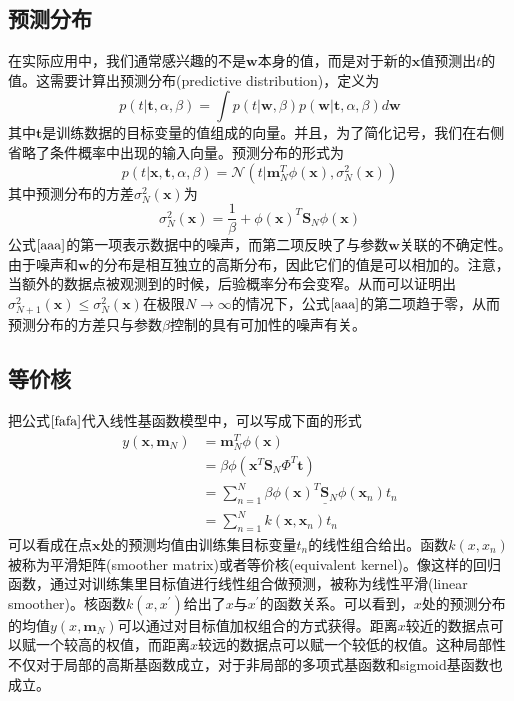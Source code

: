 \subsection*{预测分布}
在实际应用中，我们通常感兴趣的不是$\boldsymbol{w}$本身的值，而是对于新的$\boldsymbol{x}$值预测出$t$的值。这需要计算出预测分布(predictive distribution)，定义为
\begin{equation}
	p(t|\boldsymbol{t},\alpha,\beta)=\int p(t|\boldsymbol{w},\beta)p(\boldsymbol{w}|\boldsymbol{t},\alpha,\beta)d\boldsymbol{w}
\end{equation}
其中$\boldsymbol{t}$是训练数据的目标变量的值组成的向量。并且，为了简化记号，我们在右侧省略了条件概率中出现的输入向量。预测分布的形式为
\begin{equation}
	p(t|\boldsymbol{x},\boldsymbol{t},\alpha,\beta)=\mathcal{N}(t|\boldsymbol{m}^T_N\phi(\boldsymbol{x}),\sigma^2_N(\boldsymbol{x}))
\end{equation}
其中预测分布的方差$\sigma_N^2(\boldsymbol{x})$为
\begin{equation}
\label{aaa}
	\sigma_N^2(\boldsymbol{x})=\frac{1}{\beta}+\phi(\boldsymbol{x})^T\boldsymbol{S}_N\phi(\boldsymbol{x})
\end{equation}
公式$\ref{aaa}$的第一项表示数据中的噪声，而第二项反映了与参数$\boldsymbol{w}$关联的不确定性。由于噪声和$\boldsymbol{w}$的分布是相互独立的高斯分布，因此它们的值是可以相加的。注意，当额外的数据点被观测到的时候，后验概率分布会变窄。从而可以证明出$\sigma^2_{N+1}(\boldsymbol{x})\leqslant \sigma_N^2(\boldsymbol{x})$在极限$N\to \infty$的情况下，公式$\ref{aaa}$的第二项趋于零，从而预测分布的方差只与参数$\beta$控制的具有可加性的噪声有关。
\subsection*{等价核}
把公式$\ref{fafa}$代入线性基函数模型中，可以写成下面的形式
\begin{equation}
\begin{aligned}
	y(\boldsymbol{x},\boldsymbol{m}_N)&=\boldsymbol{m}_N^T\phi(\boldsymbol{x})\\
	&=\beta\phi(\boldsymbol{x}^T\boldsymbol{S}_N\Phi^T\boldsymbol{t})\\
	&=\sum_{n=1}^{N}\underline{\beta\phi(\boldsymbol{x})^T\boldsymbol{S}_N\phi(\boldsymbol{x}_n)}t_n\\
	&=\sum_{n=1}^{N}k(\boldsymbol{x},\boldsymbol{x}_n)t_n
\end{aligned}
\end{equation}
可以看成在点$\boldsymbol{x}$处的预测均值由训练集目标变量$t_n$的线性组合给出。函数$k(x,x_n)$被称为平滑矩阵(smoother matrix)或者等价核(equivalent kernel)。像这样的回归函数，通过对训练集里目标值进行线性组合做预测，被称为线性平滑(linear smoother)。核函数$k(x,x^{'})$给出了$x$与$x^{'}$的函数关系。可以看到，$x$处的预测分布的均值$y(x,\boldsymbol{m}_N)$可以通过对目标值加权组合的方式获得。距离$x$较近的数据点可以赋一个较高的权值，而距离$x$较远的数据点可以赋一个较低的权值。这种局部性不仅对于局部的高斯基函数成立，对于非局部的多项式基函数和sigmoid基函数也成立。

